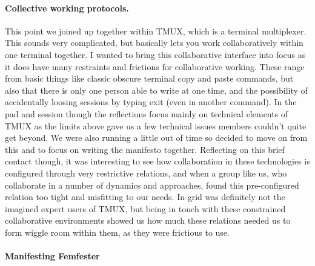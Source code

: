 \hypertarget{collective-working-protocols.}{%
\paragraph[Collective working
protocols.]{\texorpdfstring{\protect\hypertarget{anchor}{}{}Collective
working
protocols.}{Collective working protocols.}}\label{collective-working-protocols.}}

This point we joined up together within TMUX, which is a terminal
multiplexer. This sounds very complicated, but basically lets you work
collaboratively within one terminal together. I wanted to bring this
collaborative interface into focus as it does have many restraints and
frictions for collaborative working. These range from basic things like
classic obscure terminal copy and paste commands, but also that there is
only one person able to write at one time, and the possibility of
accidentally loosing sessions by typing exit (even in another command).
In the pad and session though the reflections focus mainly on technical
elements of TMUX as the limits above gave us a few technical issues
members couldn't quite get beyond. We were also running a little out of
time so decided to move on from this and to focus on writing the
manifesto together. Reflecting on this brief contact though, it was
interesting to see how collaboration in these technologies is configured
through very restrictive relations, and when a group like us, who
collaborate in a number of dynamics and approaches, found this
pre-configured relation too tight and misfitting to our needs. In-grid
was definitely not the imagined expert users of TMUX, but being in touch
with these constrained collaborative environments showed us how much
these relations needed us to form wiggle room within them, as they were
frictious to use.

\hypertarget{manifesting-femfester}{%
\paragraph[Manifesting
Femfester]{\texorpdfstring{\protect\hypertarget{anchor}{}{}Manifesting
Femfester}{Manifesting Femfester}}\label{manifesting-femfester}}

